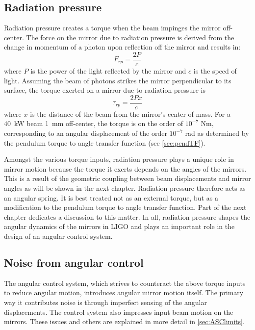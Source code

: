 


\subsection{Radiation pressure} 
Radiation pressure creates a torque when the beam impinges the mirror
off-center. The force on the mirror due to radiation pressure is
derived from the change in momentum of a photon upon reflection off
the mirror and results in:
\begin{equation}
F_{rp} = \frac{2 P} {c}
\end{equation}
where $P$ is the power of the light reflected by the mirror and $c$ is the
speed of light. Assuming the beam of photons strikes the mirror
perpendicular to its surface, the torque exerted on a mirror due to
radiation pressure is
\begin{equation}
\tau_{rp} = \frac{2 P x} {c}
\label{eq:tau_rp}
\end{equation}
where $x$ is the distance of the beam from the mirror's center of mass. For a 40~kW beam 1~mm off-center, the torque is on the order of $10^{-7}$ Nm, corresponding to an angular displacement of the order $10^{-7}$ rad as determined by the pendulum torque to angle transfer function (see \ref{sec:pendTF}).

Amongst the various torque inputs, radiation pressure plays a unique role in mirror motion because the torque it exerts depends on the angles of the mirrors. This is a result of the geometric coupling between beam displacements and mirror angles as will be shown in the next chapter. Radiation pressure therefore acts as an angular spring. It is best treated not as an external torque, but as a modification to the pendulum torque to angle transfer function. Part of the next chapter dedicates a discussion to this matter. In all, radiation pressure shapes the angular dynamics of the mirrors in LIGO and plays an important role in the design of an angular control system.



\subsection{Noise from angular control}
The angular control system, which strives to counteract the above torque inputs to reduce angular motion, introduces angular mirror motion itself. The primary way it contributes noise is through imperfect sensing of the angular displacements. The control system also impresses input beam motion on the mirrors. These issues and others are explained in more detail in \ref{sec:ASClimits}.



